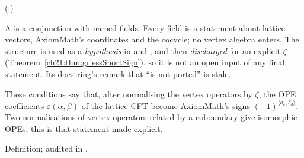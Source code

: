 (.)
\begin{dictionary}
A  is a conjunction with named fields.  Every field is a statement about
lattice vectors, AxiomMath's coordinates and the cocycle; no vertex algebra enters.  The structure is
used as a \emph{hypothesis} in  and , and then
\emph{discharged} for an explicit $\zeta$ (Theorem~\ref{ch21:thm:griessShortSign}), so it is not an open
input of any final statement.  Its docstring's remark that  ``is not ported'' is stale.
\end{dictionary}
\begin{physics}
These conditions say that, after normalising the vertex operators by $\zeta$, the OPE coefficients
$\varepsilon(\alpha,\beta)$ of the lattice CFT become AxiomMath's signs $(-1)^{\langle a_e,\delta_d\rangle}$.
Two normalisations of vertex operators related by a coboundary give isomorphic OPEs; this is that
statement made explicit.
\end{physics}
\begin{status}
Definition; audited in .
\end{status}

